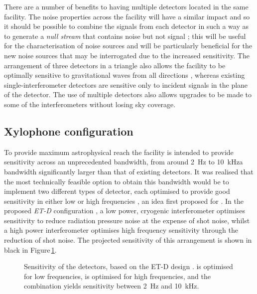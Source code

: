 There are a number of benefits to having multiple detectors located in the same facility. The noise properties across the facility will have a similar impact and so it should be possible to combine the signals from each detector in such a way as to generate a \emph{null stream} that contains noise but not signal \cite{Hewitson2005, Ajith2006}; this will be useful for the characterisation of noise sources and will be particularly beneficial for the new noise sources that may be interrogated due to the increased sensitivity. The arrangement of three detectors in a triangle also allows the facility to be optimally sensitive to gravitational waves from all directions \cite{Winkler1985}, whereas existing single-interferometer detectors are sensitive only to incident signals in the plane of the detector. The use of multiple detectors also allows upgrades to be made to some of the interferometers without losing sky coverage.

\subsection{Xylophone configuration}
To provide maximum astrophysical reach the facility is intended to provide sensitivity across an unprecedented bandwidth, from around \SI{2}{\hertz} to \SI{10}{\kilo\hertz}\textemdash a bandwidth significantly larger than that of existing detectors. It was realised that the most technically feasible option to obtain this bandwidth would be to implement two different types of detector, each optimised to provide good sensitivity in either low or high frequencies \cite{Hild2010}, an idea first proposed for \ALIGO{} \cite{Conforto2004}. In the proposed \emph{ET-D} configuration \cite{Hild2011}, a low power, cryogenic interferometer optimises sensitivity to reduce radiation pressure noise at the expense of shot noise, whilst a high power interferometer optimises high frequency sensitivity through the reduction of shot noise. The projected sensitivity of this arrangement is shown in black in Figure\,\ref{fig:et-d-sensitivity}.

\begin{figure}
  \centering
  
  \caption[Sensitivity curves for the Einstein Telescope]{\label{fig:et-d-sensitivity}Sensitivity of the \ET{} detectors, based on the ET-D design \cite{Hild2011}. \ETLF{} is optimised for low frequencies, \ETHF{} is optimised for high frequencies, and the combination yields sensitivity between \SI{2}{\hertz} and \SI{10}{\kilo\hertz}.}
\end{figure}


